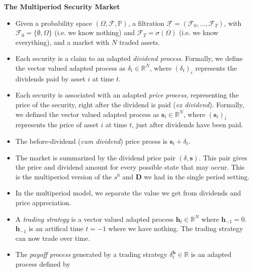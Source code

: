 \documentclass[11pt]{article}
\begin{document}
\textbf{The Multiperiod Security Market}
\begin{itemize}
    \item Given a probability space $(\Omega, \mathcal{F}, \mathbb{P})$, a filtration 
    $\underline{\mathcal{F}}=(\mathcal{F}_0, \ldots, \mathcal{F}_T)$, with $\mathcal{F}_0= \{
    \emptyset, \Omega\}$ (i.e. we know nothing) and $\mathcal{F}_T = \sigma(\Omega)$ (i.e. we 
    know everything), and a market with $N$ traded assets.
    \item Each security is a claim to an adapted \textit{dividend process}. Formally, we 
    define the vector valued adapted process as $\delta_t \in \mathbb{R}^N$, where 
    ${(\delta_t)}_i$ represents the dividends paid by asset $i$ at time $t$.
    \item Each security is associated with an adapted \textit{price process}, representing the 
    price of the security, right after the dividend is paid (\textit{ex dividend}). Formally,
    we defined the vector valued adapted process as $\boldsymbol{s}_t \in \mathbb{R}^N$, where 
    ${(\boldsymbol{s}_t)}_i$ represents the price of asset $i$ at time $t$, just after 
    dividends have been paid. 
    \item The before-dividend (\textit{cum dividend}) price proess is $\boldsymbol{s}_t +
    \delta_t$.
    \item The market is summarized by the dividend price pair $(\delta, \boldsymbol{s})$. This 
    pair gives the price and dividend amount for every possible state that may occur. This is 
    the multiperiod version of the $s^0$ and $\boldsymbol{D}$ we had in the single period 
    setting. 
    \item In the multiperiod model, we separate the value we get from dividends and price 
    appreciation. 
    \item A \textit{trading strategy} is a vector valued adapted process $\boldsymbol{h}_t \in 
    \mathbb{R}^N$ where $\boldsymbol{h}_{-1} = 0$. $\boldsymbol{h}_{-1}$ is an artifical time 
    $t=-1$ where we have nothing. The trading strategy can now trade over time. 
    \item The \textit{payoff process} generated by a trading strategy $\delta_t^
    {\boldsymbol{h}} \in \mathbb{R}$ is an adapted process defined by 


\end{itemize}
\end{document}
